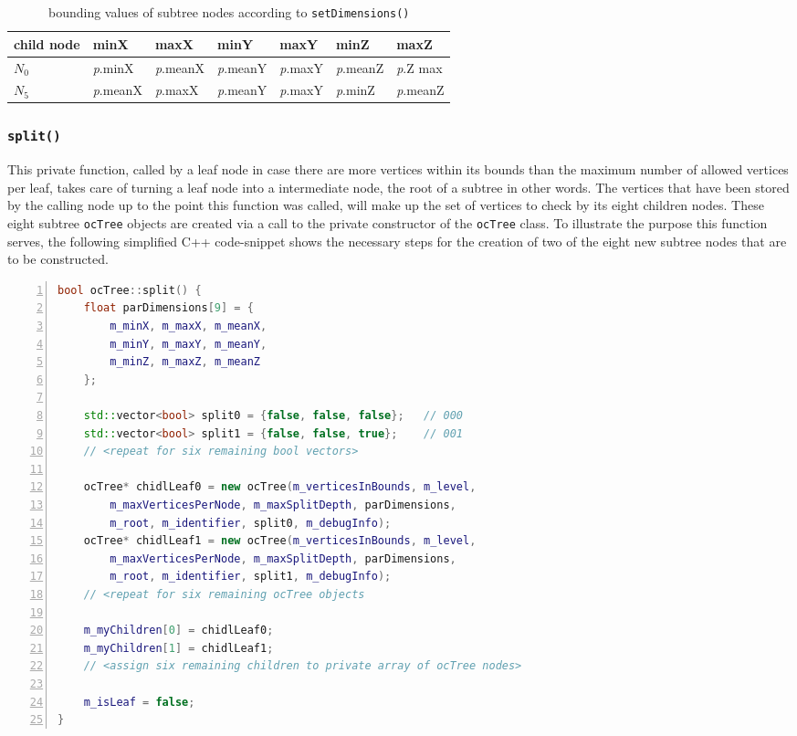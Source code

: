 \begin{table}[]
\begin{tabular}{l|llllll}
child node & minX & maxX & minY & maxY & minZ & maxZ \\ \hline
\textit{$N_0$} & \textit{p}.minX & \textit{p}.meanX & \textit{p}.meanY & \textit{p}.maxY & \textit{p}.meanZ & \textit{p}.Z max \\
\textit{$N_5$} & \textit{p}.meanX & \textit{p}.maxX & \textit{p}.meanY & \textit{p}.maxY & \textit{p}.minZ & \textit{p}.meanZ \\
\end{tabular}
\caption{bounding values of subtree nodes according to \texttt{setDimensions()}}\label{tab:bounding_values_subtree_nodes}
\end{table}

	\subsubsection{\texttt{split()}}
	\label{sec:split}
This private function, called by a leaf node in case there are more vertices within its bounds than the maximum number of allowed vertices per leaf, takes care of turning a leaf node into a intermediate node, the root of a subtree in other words. The vertices that have been stored by the calling node up to the point this function was called, will make up the set of vertices to check by its eight children nodes. These eight subtree \texttt{ocTree} objects are created via a call to the private constructor of the \texttt{ocTree} class. To illustrate the purpose this function serves, the following simplified C++ code-snippet shows the necessary steps for the creation of two of the eight new subtree nodes that are to be constructed.

\begin{minipage}{\linewidth}
\begin{lstlisting}[language=C++,numberstyle=\zebra{black!5}{white}{},numbers=left,xleftmargin=2em,tabsize=3]
bool ocTree::split() {
	float parDimensions[9] = {
		m_minX,	m_maxX,	m_meanX,
		m_minY,	m_maxY, m_meanY,
		m_minZ, m_maxZ, m_meanZ
	};

	std::vector<bool> split0 = {false, false, false};	// 000
	std::vector<bool> split1 = {false, false, true};	// 001
	// <repeat for six remaining bool vectors>

	ocTree* chidlLeaf0 = new ocTree(m_verticesInBounds, m_level,
		m_maxVerticesPerNode, m_maxSplitDepth, parDimensions,
		m_root, m_identifier, split0, m_debugInfo);
	ocTree* chidlLeaf1 = new ocTree(m_verticesInBounds, m_level,
		m_maxVerticesPerNode, m_maxSplitDepth, parDimensions,
		m_root, m_identifier, split1, m_debugInfo);
	// <repeat for six remaining ocTree objects

	m_myChildren[0] = chidlLeaf0;
	m_myChildren[1] = chidlLeaf1;
	// <assign six remaining children to private array of ocTree nodes>

	m_isLeaf = false;
}
\end{lstlisting}
\end{minipage}

